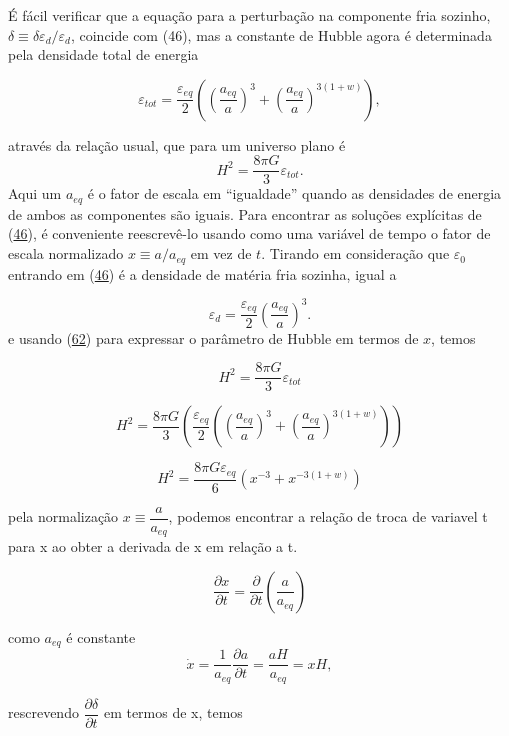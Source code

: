 \documentclass[a4paper,12pt]{article}
\begin{document}
É fácil verificar que a equação para a perturbação na componente fria
sozinho, $\delta \equiv \delta\varepsilon_d / \varepsilon_d$, coincide com (46), mas a constante de Hubble agora é determinada
pela densidade total de energia

\begin{equation}\label{eq61}
	\varepsilon_{tot} = \dfrac{\varepsilon_{eq}}{2}\left( \left( \dfrac{a_{eq}}{a}\right)^3 + \left(\dfrac{a_{eq}}{a} \right)^{3 (1+w)}\right),
\end{equation}

através da relação usual, que para um universo plano é 
\begin{equation}\label{eq62}
	H^2 = \dfrac{8\pi G}{3}\varepsilon_{tot}.
\end{equation}
Aqui um $a_{eq}$ é o fator de escala em “igualdade” quando as densidades de energia de ambos as componentes são iguais. Para encontrar as soluções explícitas de (\hyperref[eq46]{46}), é conveniente reescrevê-lo
usando como uma variável de tempo o fator de escala normalizado $x \equiv a / a_{eq}$ em vez de $t$. Tirando
em consideração que $\varepsilon_0$ entrando em (\hyperref[eq46]{46}) é a densidade de matéria fria sozinha, igual a

\begin{equation}\label{eq63}
	\varepsilon_d = \dfrac{\varepsilon_{eq}}{2}\left(\dfrac{a_{eq}}{a}\right)^3.
\end{equation}
e usando (\hyperref[eq62]{62}) para expressar o parâmetro de Hubble em termos de $x$, temos

$$H^2 = \dfrac{8\pi G}{3}\varepsilon_{tot}$$

$$H^2 = \dfrac{8\pi G}{3}\left(\dfrac{\varepsilon_{eq}}{2}\left( \left( \dfrac{a_{eq}}{a}\right)^3 + \left(\dfrac{a_{eq}}{a} \right)^{3 (1+w)}\right)\right)$$

$$H^2 = \dfrac{8\pi G\varepsilon_{eq}}{6}\left( x^{-3} +x^{-3 (1+w)}\right)$$


pela normalização $x\equiv \dfrac{a}{a_{eq}}$, podemos encontrar a relação de troca de variavel t para x ao obter a derivada de x em relação a t.

$$\dfrac{\partial x}{\partial t}= \dfrac{\partial}{\partial t}\left( \dfrac{a}{a_{eq}}\right) $$

como $a_{eq}$ é constante
$$\dot{x}= \dfrac{1}{a_{eq}} \dfrac{\partial a}{\partial t}= \dfrac{a H}{a_{eq}} = xH,$$

rescrevendo  $\dfrac{\partial \delta}{\partial t }$ em termos de x, temos
\end{document}
